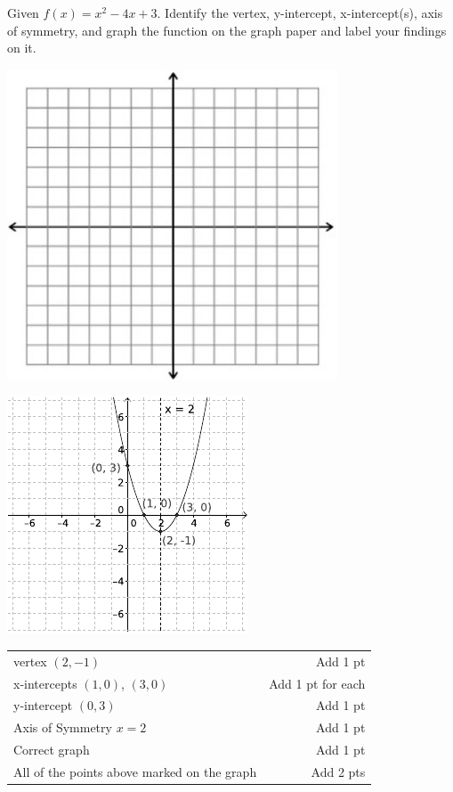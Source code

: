 {
	Given $f(x)=x^2-4x+3$. Identify the vertex, y-intercept, x-intercept(s), axis of symmetry, and graph the function on the graph paper and label your findings on it.\begin{onlyproblem}\begin{center}\includegraphics{fig-graphpaper.png}\end{center}\end{onlyproblem} \begin{onlysolution}\begin{center}\includegraphics{fig100-18-b-answer}\end{center}\end{onlysolution}
}
{
	\begin{tabular}{l r}
	vertex $(2, -1)$ & Add 1 pt\\
	x-intercepts $(1,0)$, $(3, 0)$ & Add 1 pt for each\\
	y-intercept $(0,3)$ & Add 1 pt\\
	Axis of Symmetry  $x=2$ & Add 1 pt\\
	Correct graph & Add 1 pt\\
	All of the points above marked on the graph & Add 2 pts\\
	\end{tabular}
}

